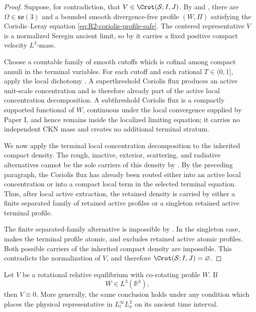 \begin{proof}
Suppose, for contradiction, that
\(V\in\Crot(\mathcal S;I,J)\).  By
 and
, there are
\(\Omega\in\mathfrak{so}(3)\) and a bounded smooth divergence-free profile
\((W,\Pi)\) satisfying the Coriolis--Leray equation
\eqref{eq:R2-coriolis-profile-safe}.  The centered representative \(V\) is a
normalized Seregin ancient limit, so by
 it carries a fixed positive compact
velocity \(L^3\)-mass.

Choose a countable family of smooth cutoffs which is cofinal among compact
annuli in the terminal variables.  For each cutoff and each rational
\(T\in(0,1]\), apply the local dichotomy
.  A superthreshold Coriolis flux produces
an active unit-scale concentration and is therefore already part of the active
local concentration decomposition.  A subthreshold Coriolis flux is a compactly
supported functional
of \(W\), continuous under the local convergence supplied by Paper I, and hence
remains inside the localized limiting equation; it carries no independent CKN
mass and creates no additional terminal stratum.

We now apply the terminal local concentration decomposition to the inherited compact
density.  The rough, inactive, exterior, scattering, and radiative alternatives
cannot be the sole carriers of this density by
.  By the preceding paragraph, the
Coriolis flux has already been routed either into an active local concentration or into a
compact local term in the selected terminal equation.  Thus, after local active
extraction, the retained density is carried by either a finite separated family
of retained active profiles or a singleton retained active terminal profile.

The finite separated-family alternative is impossible by
.  In the singleton case,
 makes the terminal profile atomic, and
 excludes retained active atomic profiles.  Both
possible carriers of the inherited compact density are impossible.  This
contradicts the normalization of \(V\), and therefore
\(\Crot(\mathcal S;I,J)=\varnothing\).
\end{proof}

\begin{proposition}
\label{prop:R2-integrable-subcase}
Let \(V\) be a rotational relative equilibrium with co-rotating profile \(W\).
If
\begin{equation}\label{eq:R2-L3-subcase}
   W\in L^3(\mathbb R^3),
\end{equation}
then \(V\equiv0\).  More generally, the same conclusion holds under any
condition which places the physical representative in
\(L^\infty_tL^3_x\) on its ancient time interval.
\end{proposition}

